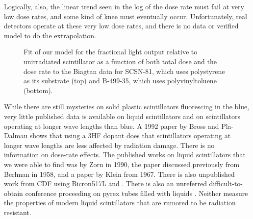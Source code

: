 Logically, also,
the linear trend seen  in the log of the dose rate must fail at 
very low dose rates, and some kind of knee must eventually occur.  
Unfortunately, real detectors operate at these very low dose rates,
and there is no data or verified model to do the extrapolation.



\begin{figure}[!htbp]
\centering
\caption{
Fit of our model for the fractional light output relative to
unirradiated scintillator as a function of both total dose
and the dose rate
to the Biagtan data \cite{Biagtan1996125}
for SCSN-81, which uses polystyrene as its substrate (top) and 
B-499-35, which uses polyvinyltoluene (bottom).
}
\label{fig:kevinfit}
\end{figure}

While there are still mysteries on solid plastic scintillators
fluorescing in the blue, very little
published data is available on liquid scintillators and
on scintillators operating at longer wave lengths than blue.
A 1992 paper by Bross and Pla-Dalmau \cite{173178} shows that using
a 3HF dopant does that scintillators operating at longer
wave lengths are less affected by radiation damage.  
There is no information on dose-rate effects.  
The published works on liquid scintillators that we were able
to find was by Zorn \cite{zornliquid} in 1990, the paper
discussed previously from Berlman in 1958, and a paper
by Klein from 1967\cite{Klein1967399}.  There is also
unpublished work from CDF using Bicron517L\cite{kenichi1} and
\cite{kenichi2}.
There is also an unreferred difficult-to-obtain conference
proceeding on pyrex tubes filled with liquids \cite{fsuliquid}.
Neither measure
the properties of modern liquid scintillators that are rumored
to be radiation resistant.


